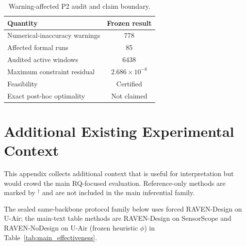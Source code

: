 \begin{table}[!t]
\centering
\caption{Warning-affected P2 audit and claim boundary.}
\label{tab:app_p2_warning_audit}
\footnotesize
\setlength{\tabcolsep}{5pt}
\begin{tabular*}{\columnwidth}{@{\extracolsep{\fill}}lc}
\toprule
Quantity & Frozen result\\
\midrule
Numerical-inaccuracy warnings & 778\\
Affected formal runs & 85\\
Audited active windows & 6438\\
Maximum constraint residual & $2.686\times10^{-8}$\\
Feasibility & Certified\\
Exact post-hoc optimality & Not claimed\\
\bottomrule
\end{tabular*}
\end{table}


\FloatBarrier

\section{Additional Existing Experimental Context}
\label{app:additional_context}

This appendix collects additional context that is useful for interpretation but
would crowd the main RQ-focused evaluation.  Reference-only methods are marked
by $^\dagger$ and are not included in the main inferential family.

The sealed same-backbone protocol family below uses forced RAVEN-Design on U-Air;
the main-text table methods are RAVEN-Design on SensorScope and
RAVEN-NoDesign on U-Air
(frozen heuristic $\phi$) in Table~\ref{tab:main_effectiveness}.

